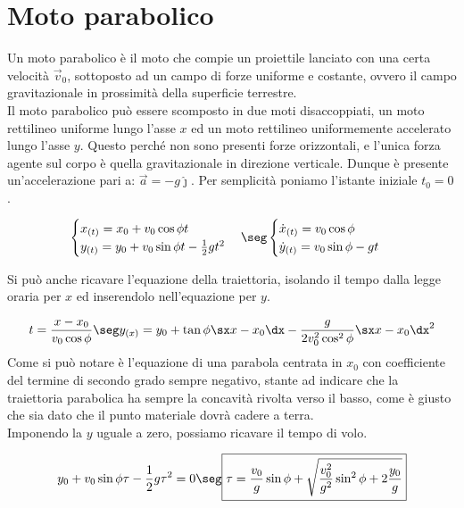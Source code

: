 \section{Moto parabolico}
Un moto parabolico è il moto che compie un proiettile lanciato con una certa velocità $\vec v_0$, sottoposto ad un campo di forze uniforme e costante, ovvero il campo gravitazionale in prossimità della superficie terrestre.\\
Il moto parabolico può essere scomposto in due moti disaccoppiati, un moto rettilineo uniforme lungo l'asse $x$ ed un moto rettilineo uniformemente accelerato lungo l'asse $y$. Questo perché non sono presenti forze orizzontali, e l'unica forza agente sul corpo è quella gravitazionale in direzione verticale. Dunque è presente un'accelerazione pari a: $\vec a = -g\hat\jmath $. Per semplicità poniamo l'istante iniziale $ t_0 = 0$.




\begin{equation}
\begin{cases}
x_{(t)} = x_0 + v_0\cos\phi t\\
y_{(t)} = y_0 + v_0\sin\phi t - \frac12 g t^2
\end{cases}\seg
\begin{cases}
\dot x_{(t)} = v_0\cos\phi \\
\dot y_{(t)} = v_0\sin\phi - gt
\end{cases}
\end{equation}

Si può anche ricavare l'equazione della traiettoria, isolando il tempo dalla legge oraria per $x$ ed inserendolo nell'equazione per $y$.

\begin{equation}
t = \frac{x-x_0}{v_0\cos\phi}\seg y_{(x)} = y_0 + \tan\phi\sx x-x_0\dx-\frac{g}{2v_0^2\cos^2\phi}\sx x-x_0\dx^2
\end{equation}
 Come si può notare è l'equazione di una parabola centrata in $x_0$ con coefficiente del termine di secondo grado sempre negativo, stante ad indicare che la traiettoria parabolica ha sempre la concavità rivolta verso il basso, come è giusto che sia dato che il punto materiale dovrà cadere a terra.\\ Imponendo la $y$ uguale a zero, possiamo ricavare il tempo di volo.
 
\begin{equation}
y_0 + v_0\sin\phi \tau - \frac12 g \tau^2 = 0 \seg \boxed{\tau = \frac{v_0}{g}\sin\phi + \sqrt{\frac{v_0^2}{g^2}\sin^2\phi+2\frac{y_0}g}}
\end{equation}

